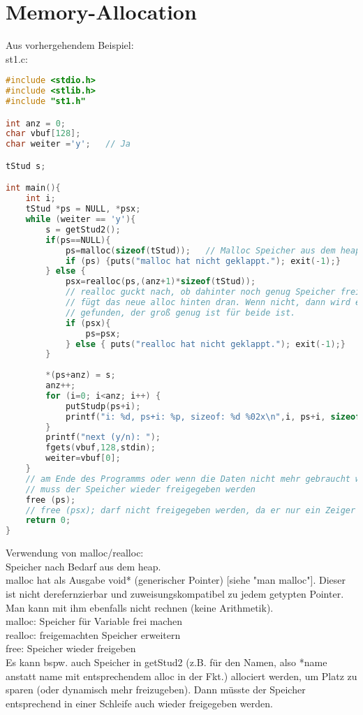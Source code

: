 \section{Memory-Allocation}
Aus vorhergehendem Beispiel:\\
st1.c:
\begin{lstlisting}[language=C]
#include <stdio.h>
#include <stlib.h>
#include "st1.h"

int anz = 0;
char vbuf[128];
char weiter ='y';	// Ja

tStud s;

int main(){
	int i;
	tStud *ps = NULL, *psx;
	while (weiter == 'y'){
		s = getStud2();
		if(ps==NULL){
			ps=malloc(sizeof(tStud));	// Malloc Speicher aus dem heap
			if (ps) {puts("malloc hat nicht geklappt."); exit(-1);}
		} else {
			psx=realloc(ps,(anz+1)*sizeof(tStud));
			// realloc guckt nach, ob dahinter noch genug Speicher frei ist und
			// fügt das neue alloc hinten dran. Wenn nicht, dann wird ein neuer Speicherbereich
			// gefunden, der groß genug ist für beide ist.
			if (psx){
				ps=psx;
			} else { puts("realloc hat nicht geklappt."); exit(-1);}
		}
		
		*(ps+anz) = s;
		anz++;
		for (i=0; i<anz; i++) {
			putStudp(ps+i);
			printf("i: %d, ps+i: %p, sizeof: %d %02x\n",i, ps+i, sizeof(tStud),sizeof(tStud));
		}
		printf("next (y/n): ");
		fgets(vbuf,128,stdin); 
		weiter=vbuf[0];
	}
	// am Ende des Programms oder wenn die Daten nicht mehr gebraucht werden
	// muss der Speicher wieder freigegeben werden
	free (ps);
	// free (psx); darf nicht freigegeben werden, da er nur ein Zeiger auf den ps ist.
	return 0;
}
\end{lstlisting}
Verwendung von malloc/realloc:\\
Speicher nach Bedarf aus dem heap.\\
malloc hat als Ausgabe void* (generischer Pointer) [siehe "man malloc"]. Dieser ist nicht derefernzierbar und zuweisungskompatibel zu jedem getypten Pointer. Man kann mit ihm ebenfalls nicht rechnen (keine Arithmetik).\\
malloc: Speicher für Variable frei machen\\
realloc: freigemachten Speicher erweitern\\
free: Speicher wieder freigeben\bigskip\\
Es kann bspw. auch Speicher in getStud2 (z.B. für den Namen, also *name anstatt name mit entsprechendem alloc in der Fkt.) allociert werden, um Platz zu sparen (oder dynamisch mehr freizugeben). Dann müsste der Speicher entsprechend in einer Schleife auch wieder freigegeben werden.

